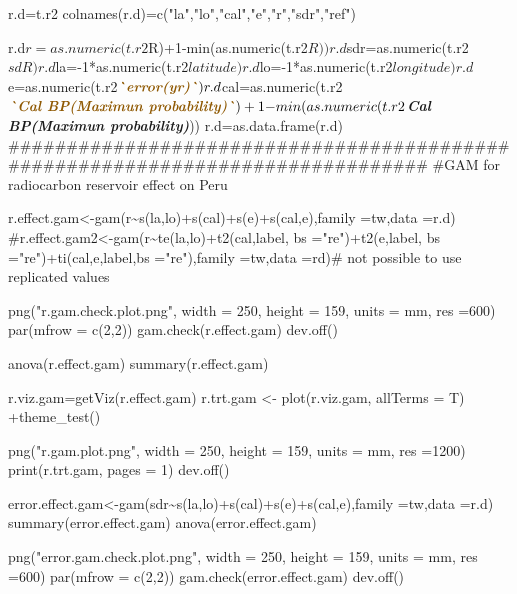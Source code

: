 \documentclass[
]{article}
\newenvironment{Shaded}{\begin{snugshade}}{\end{snugshade}}
\newcommand{\InformationTok}[1]{\textcolor[rgb]{0.56,0.35,0.01}{\textbf{\textit{#1}}}}
\newcommand{\NormalTok}[1]{#1}
\begin{document}
\begin{Shaded}
\begin{Highlighting}[]
\NormalTok{r.d=t.r2}
\NormalTok{colnames(r.d)=c("la","lo","cal","e","r","sdr","ref")}

\NormalTok{r.d$r=as.numeric(t.r2$R)+1{-}min(as.numeric(t.r2$R))}
\NormalTok{r.d$sdr=as.numeric(t.r2$sdR)}
\NormalTok{r.d$la={-}1*as.numeric(t.r2$latitude)}
\NormalTok{r.d$lo={-}1*as.numeric(t.r2$longitude)}
\NormalTok{r.d$e=as.numeric(t.r2$}\InformationTok{\textasciigrave{}error(yr)\textasciigrave{}}\NormalTok{)}
\NormalTok{r.d$cal=as.numeric(t.r2$}\InformationTok{\textasciigrave{}Cal BP(Maximun probability)\textasciigrave{}}\NormalTok{)+1{-}min(as.numeric(t.r2$}\InformationTok{\textasciigrave{}Cal BP(Maximun probability)\textasciigrave{}}\NormalTok{))}
\NormalTok{r.d=as.data.frame(r.d)}
\NormalTok{\#\#\#\#\#\#\#\#\#\#\#\#\#\#\#\#\#\#\#\#\#\#\#\#\#\#\#\#\#\#\#\#\#\#\#\#\#\#\#\#\#\#\#\#\#\#\#\#\#\#\#\#\#\#\#\#\#\#\#\#\#\#\#\#\#\#\#\#\#\#\#\#\#\#\#\#\#\#\#}
\NormalTok{\#GAM for radiocarbon reservoir effect on Peru }

\NormalTok{r.effect.gam\textless{}{-}gam(r\textasciitilde{}s(la,lo)+s(cal)+s(e)+s(cal,e),family =tw,data =r.d)}
\NormalTok{\#r.effect.gam2\textless{}{-}gam(r\textasciitilde{}te(la,lo)+t2(cal,label, bs ="re")+t2(e,label, bs ="re")+ti(cal,e,label,bs ="re"),family =tw,data =rd)\# not possible to use replicated values}

\NormalTok{png("r.gam.check.plot.png", width = 250, height = 159, units = \textquotesingle{}mm\textquotesingle{}, res =600)}
\NormalTok{par(mfrow = c(2,2))}
\NormalTok{gam.check(r.effect.gam)}
\NormalTok{dev.off()}

\NormalTok{anova(r.effect.gam)}
\NormalTok{summary(r.effect.gam)}

\NormalTok{r.viz.gam=getViz(r.effect.gam)}
\NormalTok{r.trt.gam \textless{}{-} plot(r.viz.gam, allTerms = T) +theme\_test()}

\NormalTok{png("r.gam.plot.png", width = 250, height = 159, units = \textquotesingle{}mm\textquotesingle{}, res =1200)}
\NormalTok{print(r.trt.gam, pages = 1)}
\NormalTok{dev.off()}

\NormalTok{error.effect.gam\textless{}{-}gam(sdr\textasciitilde{}s(la,lo)+s(cal)+s(e)+s(cal,e),family =tw,data =r.d)}
\NormalTok{summary(error.effect.gam)}
\NormalTok{anova(error.effect.gam)}

\NormalTok{png("error.gam.check.plot.png", width = 250, height = 159, units = \textquotesingle{}mm\textquotesingle{}, res =600)}
\NormalTok{par(mfrow = c(2,2))}
\NormalTok{gam.check(error.effect.gam)}
\NormalTok{dev.off()}


\end{Highlighting}
\end{Shaded}
\end{document}
